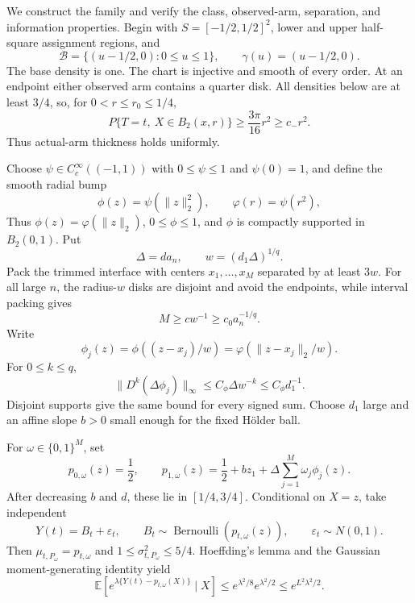 We construct the family and verify the class, observed-arm, separation, and information properties.  Begin with \(S=[-1/2,1/2]^2\), lower and upper half-square assignment regions, and
\[
 \mathcal B=\{(u-1/2,0):0\leq u\leq1\},
 \qquad \gamma(u)=(u-1/2,0).
\]
The base density is one.  The chart is injective and smooth of every order.  At an endpoint either observed arm contains a quarter disk.  All densities below are at least \(3/4\), so, for \(0<r\leq r_0\leq1/4\),
\[
 P\{T=t,\ X\in B_2(x,r)\}\geq\frac{3\pi}{16}r^2\geq c_-r^2.
\]
Thus actual-arm thickness holds uniformly.

Choose \(\psi\in C_c^\infty((-1,1))\) with \(0\leq\psi\leq1\) and \(\psi(0)=1\), and define the smooth radial bump
\[
 \phi(z)=\psi(\lVert z\rVert_2^2),
 \qquad
 \varphi(r)=\psi(r^2),
\]
Thus \(\phi(z)=\varphi(\lVert z\rVert_2)\), \(0\leq\phi\leq1\), and \(\phi\) is compactly supported in \(B_2(0,1)\).  Put
\[
 \Delta=d a_n,
 \qquad w=(d_1\Delta)^{1/q}.
\]
Pack the trimmed interface with centers \(x_1,\ldots,x_M\) separated by at least \(3w\).  For all large \(n\), the radius-\(w\) disks are disjoint and avoid the endpoints, while interval packing gives
\[
 M\geq c w^{-1}\geq c_0a_n^{-1/q}.
\]
Write
\[
 \phi_j(z)=\phi((z-x_j)/w)
 =\varphi(\lVert z-x_j\rVert_2/w).
\]
For \(0\leq k\leq q\),
\[
 \lVert D^k(\Delta\phi_j)\rVert_\infty
 \leq C_\phi\Delta w^{-k}\leq C_\phi d_1^{-1}.
\]
Disjoint supports give the same bound for every signed sum.  Choose \(d_1\) large and an affine slope \(b>0\) small enough for the fixed H\"older ball.

For \(\omega\in\{0,1\}^M\), set
\[
 p_{0,\omega}(z)=\frac12,
 \qquad
 p_{1,\omega}(z)=\frac12+bz_1
 +\Delta\sum_{j=1}^M\omega_j\phi_j(z).
\]
After decreasing \(b\) and \(d\), these lie in \([1/4,3/4]\).  Conditional on \(X=z\), take independent
\[
 Y(t)=B_t+\varepsilon_t,
 \qquad B_t\sim\operatorname{Bernoulli}(p_{t,\omega}(z)),
 \qquad \varepsilon_t\sim N(0,1).
\]
Then \(\mu_{t,P_\omega}=p_{t,\omega}\) and \(1\leq\sigma^2_{t,P_\omega}\leq5/4\).  Hoeffding's lemma and the Gaussian moment-generating identity yield
\[
 \mathbb E\!\left[e^{\lambda\{Y(t)-p_{t,\omega}(X)\}}\mid X\right]
 \leq e^{\lambda^2/8}e^{\lambda^2/2}
 \leq e^{L^2\lambda^2/2}.
\]

